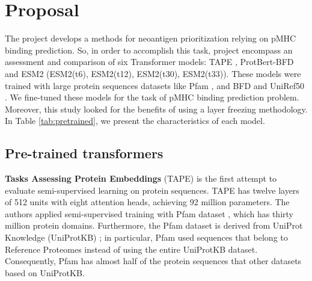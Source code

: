 \section{Proposal}




The project develops a methods for neoantigen prioritization relying on pMHC binding prediction. So, in order to accomplish this task, project encompass an assessment and comparison of six Transformer models: TAPE \cite{rao2019evaluating}, ProtBert-BFD \cite{elnaggar2021prottrans} and ESM2 \cite{lin2023evolutionary} (ESM2(t6), ESM2(t12), ESM2(t30), ESM2(t33)). These models were trained with large protein sequences datasets like Pfam \cite{el2019pfam}, and BFD and UniRef50  \cite{suzek2015uniref}. We fine-tuned these models for the task of pMHC binding prediction problem. Moreover, this study looked for the benefits of using a layer freezing methodology.  In Table \ref{tab:pretrained}, we present the characteristics of each model.


\subsection{Pre-trained transformers}

\textbf{Tasks Assessing Protein Embeddings} (TAPE) \cite{rao2019evaluating} is the first attempt to evaluate semi-supervised learning on protein sequences. TAPE has twelve layers of 512 units with eight attention heads, achieving 92 million parameters. The authors applied semi-supervised training with Pfam dataset \cite{el2019pfam}, which has thirty million protein domains. Furthermore, the Pfam dataset is derived from UniProt Knowledge (UniProtKB) \cite{uniprot2018uniprot}; in particular, Pfam used sequences that belong to Reference Proteomes \cite{finn2016pfam} instead of using the entire UniProtKB dataset. Consequently, Pfam has almost half of the protein sequences that other datasets based on UniProtKB. 




